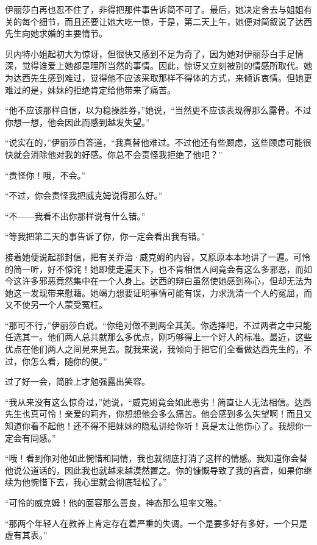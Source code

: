 \par 伊丽莎白再也忍不住了，非得把那件事告诉简不可了。最后，她决定舍去与姐姐有关的每个细节，而且还要让她大吃一惊，于是，第二天上午，她便对简叙说了达西先生向她求婚的主要情节。
\par 贝内特小姐起初大为惊讶，但很快又感到不足为奇了，因为她对伊丽莎白手足情深，觉得谁爱上她都是理所当然的事情。因此，惊讶又立刻被别的情感所取代。她为达西先生感到难过，觉得他不应该采取那样不得体的方式，来倾诉衷情。但她更难过的是，妹妹的拒绝肯定给他带来了痛苦。
\par “他不应该那样自信，以为稳操胜券，”她说，“当然更不应该表现得那么露骨。不过你想一想，他会因此而感到越发失望。”
\par “说实在的，”伊丽莎白答道，“我真替他难过。不过他还有些顾虑，这些顾虑可能很快就会消除他对我的好感。你总不会责怪我拒绝了他吧？”
\par “责怪你！哦，不会。”
\par “不过，你会责怪我把威克姆说得那么好。”
\par “不——我看不出你那样说有什么错。”
\par “等我把第二天的事告诉了你，你一定会看出我有错。”
\par 接着她便说起那封信，把有关乔治·威克姆的内容，又原原本本地讲了一遍。可怜的简一听，好不惊诧！她即使走遍天下，也不肯相信人间竟会有这么多邪恶，而如今这许多邪恶竟然集中在一个人身上。达西的辩白虽然使她感到称心，但却无法为她这一发现带来慰藉。她竭力想要证明事情可能有误，力求洗清一个人的冤屈，而又不使另一个人蒙受冤枉。
\par “那可不行，”伊丽莎白说。“你绝对做不到两全其美。你选择吧，不过两者之中只能任选其一。他们两人总共就那么多优点，刚巧够得上一个好人的标准。最近，这些优点在他们两人之间晃来晃去。就我来说，我倾向于把它们全看做达西先生的，不过，你怎么看，随你的便。”
\par 过了好一会，简脸上才勉强露出笑容。
\par “我从来没有这么惊奇过，”她说，“威克姆竟会如此恶劣！简直让人无法相信。达西先生也真可怜！亲爱的莉齐，你想想他会多么痛苦。他会感到多么失望啊！而且又知道你看不起他！还不得不把妹妹的隐私讲给你听！真是太让他伤心了。我想你一定会有同感。”
\par “哦！看到你对他如此惋惜和同情，我也就彻底打消了这样的情感。我知道你会替他说公道话的，因此我也就越来越漠然置之。你的慷慨导致了我的吝啬，如果你继续为他惋惜下去，我心里就会彻底轻松了。”
\par “可怜的威克姆！他的面容那么善良，神态那么坦率文雅。”
\par “那两个年轻人在教养上肯定存在着严重的失调。一个是要多好有多好，一个只是虚有其表。”
